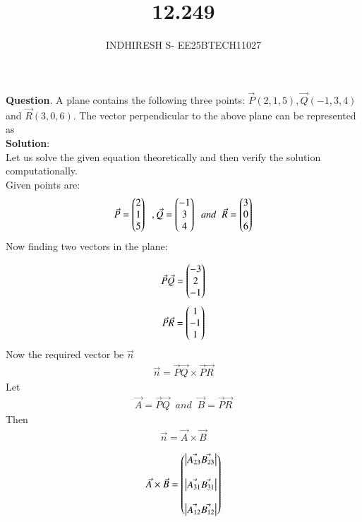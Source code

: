 \documentclass[journal]{IEEEtran}
\theoremstyle{remark}
\begin{document}

\onecolumn

\title{12.249}
\author{INDHIRESH S- EE25BTECH11027}
\maketitle


\renewcommand{\thefigure}{\theenumi}
\renewcommand{\thetable}{\theenumi}

\textbf{Question}. A plane contains the following three points: $\Vec{P}(2, 1, 5), \Vec{Q}(-1, 3, 4)$ and $\Vec{R}(3, 0, 6)$. The vector perpendicular to the above plane can be represented as\\
\textbf{Solution}:\\
Let us solve the given equation theoretically and then verify the solution computationally. \\
Given points are:
\begin{align}
 \Vec{P}=\begin{pmatrix}2\\1\\5\end{pmatrix}\;\;,\Vec{Q}=\begin{pmatrix}-1\\3\\4\end{pmatrix}\;\;and\;\;\Vec{R}=\begin{pmatrix}3\\0\\6\end{pmatrix}
\end{align}
Now finding two vectors in the plane:

\begin{align}
 \Vec{P}\Vec{Q}=\begin{pmatrix}-3\\2\\-1\end{pmatrix}
\end{align}
\begin{align}
\Vec{P}\Vec{R}=\begin{pmatrix}1\\-1\\1\end{pmatrix}
\end{align}
Now the required vector be $\Vec{n}$
\begin{align}
\Vec{n}=\Vec{P}\Vec{Q}\times\Vec{P}\Vec{R}
\end{align}
Let
\begin{align}
    \Vec{A}=\Vec{P}\Vec{Q}\;\;and\;\;\Vec{B}=\Vec{P}\Vec{R}
\end{align}
Then
\begin{align}
    \Vec{n}=\Vec{A}\times\Vec{B}
\end{align}

\begin{align}
\Vec{A}\times\Vec{B}=\begin{pmatrix}\begin{vmatrix}\Vec{A_{23}}\Vec{B_{23}}\end{vmatrix}\\\\\begin{vmatrix}\Vec{A_{31}} \Vec{B_{31}}\end{vmatrix}\\\\\begin{vmatrix}\Vec{A_{12}} \Vec{B_{12}}\end{vmatrix}\end{pmatrix}
\end{align}
\end{document}
